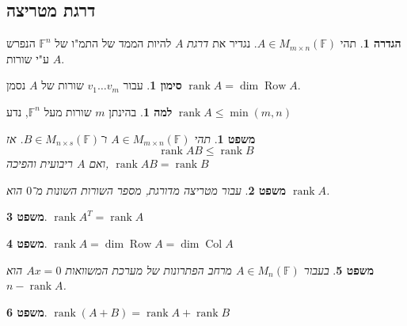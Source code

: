 \documentclass[]{article}
\DeclareMathOperator{\row}    {Row}
\DeclareMathOperator{\rk}     {rank}
\DeclareMathOperator{\col}    {Col}
\newcommand\F         {\mathbb{F}}
\newcommand\mat[2]    {M_{#1\times#2}}
\newcommand\gmat      {\mat{m}{n}(\F)}
\newtheorem{Theorem}{משפט}
\theoremstyle{definition}
\newtheorem{definition}{הגדרה}
\newtheorem{Lemma}{למה}
\newtheorem{Notion}{סימון}
\newcommand\theo  [1] {\begin{Theorem}#1\end{Theorem}}
\newcommand\defi  [1] {\begin{definition}#1\end{definition}}
\newcommand\lem   [1] {\begin{Lemma}#1\end{Lemma}}
\newcommand\noti  [1] {\begin{Notion}#1\end{Notion}}
\begin{document}
\begin{multicols}{2}
		\section{דרגת מטריצה}
		\defi{תהי $A \in M_{m \times n}(\F)$. נגדיר את \textit{דרגת} $A$ להיות הממד של התמ"ו של $\F^n$ הנפרש ע"י שורות $A$. }
		\noti{עבור $v_1 \dots v_m$ שורות של $A$ נסמן $\rk A = \dim \row A$. }
		\lem{בהינתן $m$ שורות מעל $\F^n$, נדע $\rk A \le \min(m, n)$}
		\theo{תהי $A \in \gmat$ ו־$B \in \mat{n}{s}(\F)$. אז \[ \rk AB \le \rk B \] ואם $A$ ריבועית והפיכה, $\rk AB = \rk B$}
		\theo{עבור מטריצה מדורגת, מספר השורות השונות מ־$0$ הוא $\rk A$. }
		\theo{\hfil $\rk A^T = \rk A$}
		\theo{\hfil $\rk A = \dim \row A = \dim \col A$}
		\theo{בעבור $A \in M_n(\F)$ מרחב הפתרונות של מערכת המשוואות $Ax = 0$ הוא $n - \rk A$. }
		\theo{\hfil $\rk (A + B) = \rk A + \rk B$}
		

\end{multicols}
\end{document}
